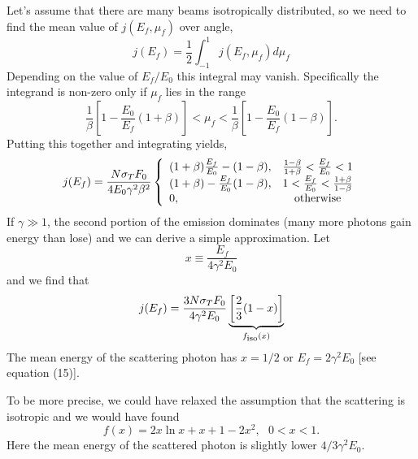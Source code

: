 Let's assume that there are many beams isotropically distributed, so
we need to find the mean value of $j(E_f,\mu_f)$ over angle,
\begin{equation}
j(E_f) = \frac{1}{2} \int_{-1}^1 j(E_f,\mu_f) d\mu_f
\label{eq:424}
\end{equation}
Depending on the value of $E_f/E_0$ this integral may vanish.
Specifically the integrand is non-zero only if $\mu_f$ lies in the
range
\begin{equation}
\frac{1}{\beta} \left [ 1 - \frac{E_0}{E_f} \left ( 1 + \beta \right )
  \right ] < \mu_f < 
\frac{1}{\beta} \left [ 1 - \frac{E_0}{E_f} \left ( 1 - \beta \right )
  \right ].
\label{eq:425}
\end{equation}
Putting this together and integrating yields,
\begin{equation}
j(E_f) = \frac{N \sigma_T F_0}{4 E_0 \gamma^2 \beta^2} \left \{
\begin{array}{lc}
  (1+\beta) \frac{E_f}{E_0} - (1 -\beta ),  & \frac{1-\beta}{1+\beta} <
  \frac{E_f}{E_0} < 1 \\
  (1+\beta) - \frac{E_f}{E_0} (1 -\beta ),  & 1 < 
  \frac{E_f}{E_0} < \frac{1+\beta}{1-\beta} \\
  0, & \hbox{\rm otherwise}
\end{array}
\right .
\label{eq:426}
\end{equation}
If $\gamma \gg 1$, the second portion of the emission dominates (many
more photons gain energy than lose) and we can derive a simple
approximation.  Let 
\begin{equation}
x \equiv \frac{E_f}{4\gamma^2 E_0}
\label{eq:427}
\end{equation}
and we find that
\begin{equation}
j(E_f) = \frac{3 N \sigma_T F_0}{4\gamma^2 E_0} \underbrace{\left [ \frac{2}{3} (
1 - x ) \right ]}_{f_{\hbox{\rm \scriptsize iso}}(x)}
\label{eq:428}
\end{equation}
The mean energy of the scattering photon has $x=1/2$ or $E_f=2\gamma^2
E_0$ [see equation (15)].

To be more precise, we could have relaxed the assumption that the
scattering is isotropic and we would have found
\begin{equation}
f(x) = 2 x \ln x + x + 1 - 2 x^2, ~~~ 0 < x < 1 .
\label{eq:429}
\end{equation}
Here the mean energy of the scattered photon is slightly lower $4/3
\gamma^2 E_0$.

